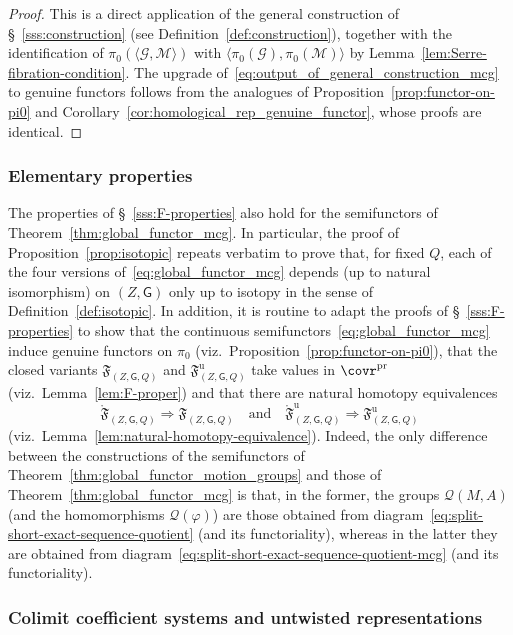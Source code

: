 \documentclass[AHL,Unicode,published]{cedram}
\newcommand{\pr}{\ensuremath{\mathrm{pr}}}
\newcommand{\Int}{\mathring}
\newcommand{\unt}{\mathrm{u}}
\newcommand{\fF}{\mathfrak{F}}
\newcommand{\sG}{\mathsf{G}}
\newcommand{\cG}{\mathcal{G}}
\newcommand{\cM}{\mathcal{M}}
\newcommand{\cQ}{\mathcal{Q}}
\begin{document}
\begin{proof}
This is a direct application of the general construction of \S~\ref{sss:construction} (see Definition~\ref{def:construction}), together with the identification of $\pi_{0}(\langle \cG, \cM \rangle)$ with $\langle \pi_{0}(\cG), \pi_{0}(\cM) \rangle$ by Lemma~\ref{lem:Serre-fibration-condition}. The upgrade of~\eqref{eq:output_of_general_construction_mcg} to genuine functors follows from the analogues of Proposition~\ref{prop:functor-on-pi0} and Corollary~\ref{cor:homological_rep_genuine_functor}, whose proofs are identical.
\end{proof}


\subsubsection{Elementary properties}\label{sss:elementary_properties_mcg}

The properties of \S~\ref{sss:F-properties} also hold for the semifunctors of Theorem~\ref{thm:global_functor_mcg}. In particular, the proof of Proposition~\ref{prop:isotopic} repeats verbatim to prove that, for fixed $Q$, each of the four versions of~\eqref{eq:global_functor_mcg} depends (up to natural isomorphism) on $(Z,\sG)$ only up to isotopy in the sense of Definition~\ref{def:isotopic}. In addition, it is routine to adapt the proofs of \S~\ref{sss:F-properties} to show that the continuous semifunctors~\eqref{eq:global_functor_mcg} induce genuine functors on $\pi_{0}$ (viz.~Proposition~\ref{prop:functor-on-pi0}), that the closed variants $\fF_{(Z,\sG,Q)}$ and $\fF^{\unt}_{(Z,\sG,Q)}$ take values in $\covr^{\pr}$ (viz.~Lemma~\ref{lem:F-proper}) and that there are natural homotopy equivalences
\[
\Int{\fF}_{(Z,\sG,Q)} \Rightarrow \fF_{(Z,\sG,Q)}\quad\text{and}\quad\Int{\fF}^{\unt}_{(Z,\sG,Q)} \Rightarrow \fF^{\unt}_{(Z,\sG,Q)}
\]
(viz.~Lemma~\ref{lem:natural-homotopy-equivalence}). Indeed, the only difference between the constructions of the semifunctors of Theorem~\ref{thm:global_functor_motion_groups} and those of Theorem~\ref{thm:global_functor_mcg} is that, in the former, the groups $\cQ(M,A)$ (and the homomorphisms $\cQ(\varphi)$) are those obtained from diagram~\eqref{eq:split-short-exact-sequence-quotient} (and its functoriality), whereas in the latter they are obtained from diagram~\eqref{eq:split-short-exact-sequence-quotient-mcg} (and its functoriality).


\subsubsection{Colimit coefficient systems and untwisted representations}\label{sss:col_coeff_unwtisted_rep_mcg}
\end{document}
